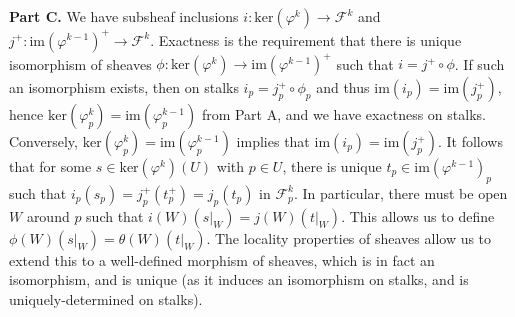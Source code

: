 \documentclass[aps,pra,showpacs,notitlepage,onecolumn,superscriptaddress,nofootinbib]{revtex4-1}
\theoremstyle{definition}
\begin{document}
\noindent \textbf{Part C.} We have subsheaf inclusions $i : \text{ker}(\varphi^k) \to \mathcal{F}^k$ and $j^{+} : \text{im}(\varphi^{k-1})^{+} \to \mathcal{F}^k$. Exactness
is the requirement that there is unique isomorphism of sheaves $\phi : \text{ker}(\varphi^k) \to \text{im}(\varphi^{k-1})^{+}$ such that $i = j^{+} \circ \phi$. If such
an isomorphism exists, then on stalks $i_p = j^{+}_p \circ \phi_p$ and thus $\text{im}(i_p) = \text{im}(j^{+}_p)$, hence $\text{ker}(\varphi^k_p) = \text{im}(\varphi^{k-1}_p)$
from Part A, and we have exactness on stalks. Conversely, $\text{ker}(\varphi^k_p) = \text{im}(\varphi^{k-1}_p)$ implies that $\text{im}(i_p) = \text{im}(j^{+}_p)$. It follows that
for some $s \in \text{ker}(\varphi^k)(U)$ with $p \in U$, there is unique $t_p \in \text{im}(\varphi^{k-1})_p$ such that $i_p(s_p) = j^{+}_p(t^{+}_p) = j_p(t_p)$ in $\mathcal{F}^k_p$. In
particular, there must be open $W$ around $p$ such that $i(W)(s|_W) = j(W)(t|_W)$. This allows us to define $\phi(W)(s|_W) = \theta(W)(t|_W)$. The locality properties of sheaves allow
us to extend this to a well-defined morphism of sheaves, which is in fact an isomorphism, and is unique (as it induces an isomorphism on stalks, and is uniquely-determined on stalks).
\end{document}

